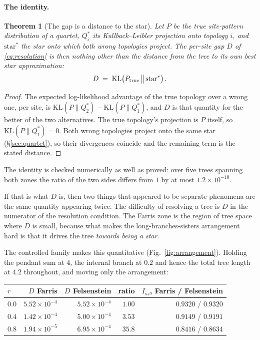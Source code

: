 \documentclass[preprint,12pt,authoryear]{elsarticle}
\newcommand{\Iss}{I_{ss}}
\newtheorem{theorem}{Theorem}
\theoremstyle{definition}
\theoremstyle{remark}
\begin{document}
\paragraph{The identity.}

\begin{theorem}[The gap is a distance to the star]
\label{thm:delta-is-kl}
Let $P$ be the true site-pattern distribution of a quartet, $Q_i^{*}$ its
Kullback--Leibler projection onto topology $i$, and
$\mathrm{star}^{*}$ the star onto which both wrong topologies project. The
per-site gap $D$ of \eqref{eq:resolution} is then nothing other than the
distance from the tree to its own best star approximation:
\begin{equation}
D \;=\; \mathrm{KL}\!\left(P_{\rm true}\,\big\|\,\mathrm{star}^{*}\right).
\label{eq:delta-is-kl}
\end{equation}
\end{theorem}

\begin{proof}
The expected log-likelihood advantage of the true topology over a wrong one,
per site, is $\mathrm{KL}(P\|Q_2^{*})-\mathrm{KL}(P\|Q_1^{*})$, and $D$
is that quantity for the better of the two alternatives. The true topology's
projection is $P$ itself, so $\mathrm{KL}(P\|Q_1^{*})=0$. Both wrong
topologies project onto the same star (\S\ref{sec:quartet}), so their
divergences coincide and the remaining term is the stated distance.
\end{proof}

The identity is checked numerically as well as proved: over five trees
spanning both zones the ratio of the two sides differs from $1$ by at most
$1.2\times10^{-10}$.

If that is what $D$ is, then two things that appeared to be separate
phenomena are the same quantity appearing twice. The difficulty of resolving
a tree is $D$ in the numerator of the resolution condition. The Farris
zone is the region of tree space where $D$ is small, because what makes
the long-branches-sisters arrangement hard is that it drives the tree
\emph{towards being a star}.

The controlled family makes this quantitative
(Fig.~\ref{fig:arrangement}). Holding the pendant sum at $4$, the internal
branch at $0.2$ and hence the total tree length at $4.2$ throughout, and
moving only the arrangement:

\begin{center}
\begin{tabular}{lrrrr}
\toprule
$r$ & $D$ Farris & $D$ Felsenstein & ratio
  & $\Iss$, Farris / Felsenstein \\
\midrule
$0.0$ & $5.52\times10^{-4}$ & $5.52\times10^{-4}$ & $1.00$
  & $0.9320$ / $0.9320$ \\
$0.4$ & $1.42\times10^{-4}$ & $5.00\times10^{-4}$ & $3.53$
  & $0.9149$ / $0.9191$ \\
$0.8$ & $1.94\times10^{-5}$ & $6.95\times10^{-4}$ & $35.8$
  & $0.8416$ / $0.8634$ \\
\bottomrule
\end{tabular}
\end{center}
\end{document}
